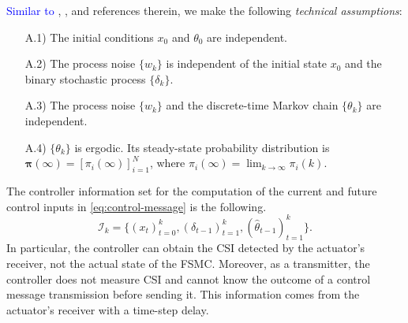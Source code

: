 \documentclass[journal,twoside,web]{ieeecolor}
\begin{document}
\textcolor{blue}{Similar to} \cite{yZL-2025-automatica}, \cite{impicciatore2024tac}, and references therein, we make the following \emph{technical assumptions}:
\begin{enumerate}
	\item[A.1)] The initial conditions $x_0$ and $\theta_0$ are independent. %
	\item[A.2)] The process noise $\{w_k\}$ is independent of the initial state $x_0$ and the binary stochastic process $\{\delta_k\}$.
	\item[A.3)] The process noise $\{w_k\}$ and the discrete-time Markov chain $\{\theta_k\}$ are independent.
	\item[A.4)] %
    $\{\theta_k\}$ is ergodic. Its steady-state probability distribution is $\bm{\pi}(\infty) = [\pi_{i}(\infty)]_{i=1}^{N}$, where $\pi_{i}(\infty) = \lim_{k\to\infty} \pi_{i}(k)$.
\end{enumerate}

The controller information set for the computation of the current and future control inputs in \eqref{eq:control-message} is the following.
	\begin{equation}\label{eq:info-set}
\mathcal{I}_{k} = \big\{
	\left(x_{t}\right)_{t=0}^{k}, 
	\left(\delta_{t-1}\right)_{t=1}^{k}, 
	(\hat{\theta}_{t-1})_{t=1}^{k} \big\}.
\end{equation}
In particular, the controller can obtain the CSI detected by the actuator's receiver, not the actual state of the FSMC. Moreover, as a transmitter, the controller does not measure CSI and cannot know the outcome of a control message transmission before sending it. This information comes from the actuator's receiver with a time-step delay.
\end{document}
